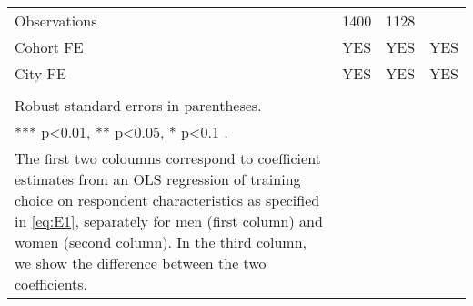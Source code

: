 \begin{longtable}{m{9cm}ccc}
Observations&1400&1128&\\
Cohort FE&YES&YES&YES\\
City FE&YES&YES&YES\\
\midrule
\begin{minipage}{16cm}
\small{
{\textit Notes:} \\
Robust standard errors in parentheses. \\
*** p\textless{}0.01, ** p\textless{}0.05, * p\textless{}0.1 . \\
The first two coloumns correspond to coefficient estimates from an OLS regression of training choice on respondent characteristics as specified in  \ref{eq:E1}, separately for men (first column) and women (second column). In the third column, we show the difference between the two coefficients. 
}
\end{minipage} \\* \bottomrule
\end{longtable}
